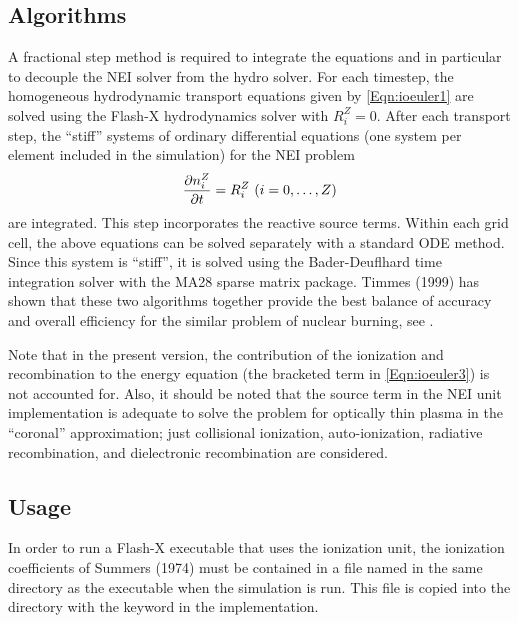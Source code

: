 \subsection{Algorithms}
A fractional step method is required to integrate the equations
and in particular to decouple the NEI solver from the hydro solver.
For each timestep, the homogeneous hydrodynamic transport equations
given by \eqref{Eqn:ioeuler1} are solved using the
Flash-X hydrodynamics solver with $R_i^Z=0$. After each transport step, the
``stiff'' systems  of ordinary differential equations (one system per element included in the simulation) for the NEI
problem
\begin{equation}
{\partial n_i^Z \over \partial t} = R_i^Z \ (i=0,\ldots,Z)
\end{equation}
are integrated.
This step incorporates the reactive source terms.  Within each grid cell, the
above equations can be solved separately with a standard ODE method.
Since this system is ``stiff'', it is solved using
the Bader-Deuflhard time integration solver
with the MA28 sparse matrix package.  Timmes (1999) has shown
that these two algorithms together provide the best balance of
accuracy and overall efficiency for the similar problem of
nuclear burning, see .

Note that in the present version, the contribution of the ionization
and recombination to the energy equation (the bracketed term in
\eqref{Eqn:ioeuler3}) is not accounted for.  Also, it should be
noted that the source term in the NEI unit implementation is adequate to solve
the problem for optically thin plasma in the ``coronal''
approximation; just collisional ionization, auto-ionization,
radiative recombination, and dielectronic recombination are
considered.

\subsection{Usage}
\label{Sec:ionization usage}

In order to run a Flash-X executable that uses the ionization
unit, the ionization coefficients of Summers (1974) must be
contained in a file named  in the same
directory as the executable when the simulation is run.  This file
is copied into the  directory
with the  keyword  in the
 implementation. 

